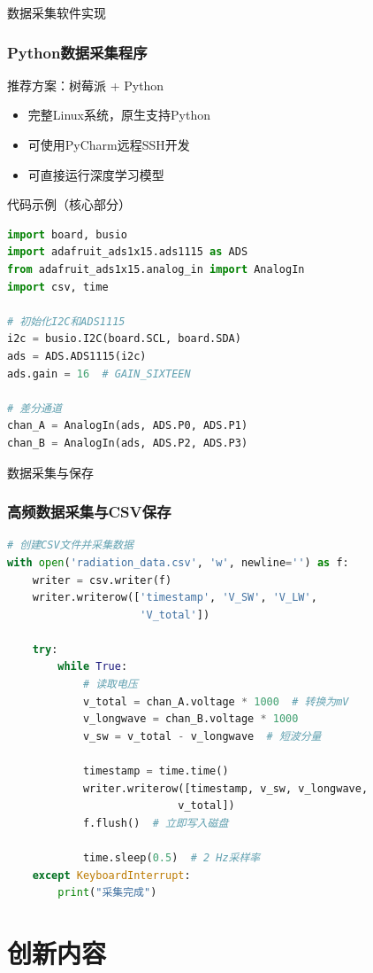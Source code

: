 \documentclass[aspectratio=169,11pt]{ctexbeamer}
\begin{document}
\begin{frame}[fragile]{数据采集软件实现}
\frametitle{Python数据采集程序}
\begin{block}{推荐方案：树莓派 + Python}
\begin{itemize}
    \item 完整Linux系统，原生支持Python
    \item 可使用PyCharm远程SSH开发
    \item 可直接运行深度学习模型
\end{itemize}
\end{block}

\begin{block}{代码示例（核心部分）}
\begin{lstlisting}[language=Python]
import board, busio
import adafruit_ads1x15.ads1115 as ADS
from adafruit_ads1x15.analog_in import AnalogIn
import csv, time

# 初始化I2C和ADS1115
i2c = busio.I2C(board.SCL, board.SDA)
ads = ADS.ADS1115(i2c)
ads.gain = 16  # GAIN_SIXTEEN

# 差分通道
chan_A = AnalogIn(ads, ADS.P0, ADS.P1)
chan_B = AnalogIn(ads, ADS.P2, ADS.P3)
\end{lstlisting}
\end{block}
\end{frame}

\begin{frame}[fragile]{数据采集与保存}
\frametitle{高频数据采集与CSV保存}
\begin{lstlisting}[language=Python]
# 创建CSV文件并采集数据
with open('radiation_data.csv', 'w', newline='') as f:
    writer = csv.writer(f)
    writer.writerow(['timestamp', 'V_SW', 'V_LW', 
                     'V_total'])
    
    try:
        while True:
            # 读取电压
            v_total = chan_A.voltage * 1000  # 转换为mV
            v_longwave = chan_B.voltage * 1000
            v_sw = v_total - v_longwave  # 短波分量
            
            timestamp = time.time()
            writer.writerow([timestamp, v_sw, v_longwave, 
                           v_total])
            f.flush()  # 立即写入磁盘
            
            time.sleep(0.5)  # 2 Hz采样率
    except KeyboardInterrupt:
        print("采集完成")
\end{lstlisting}
\end{frame}

\section{创新内容}
\end{document}
